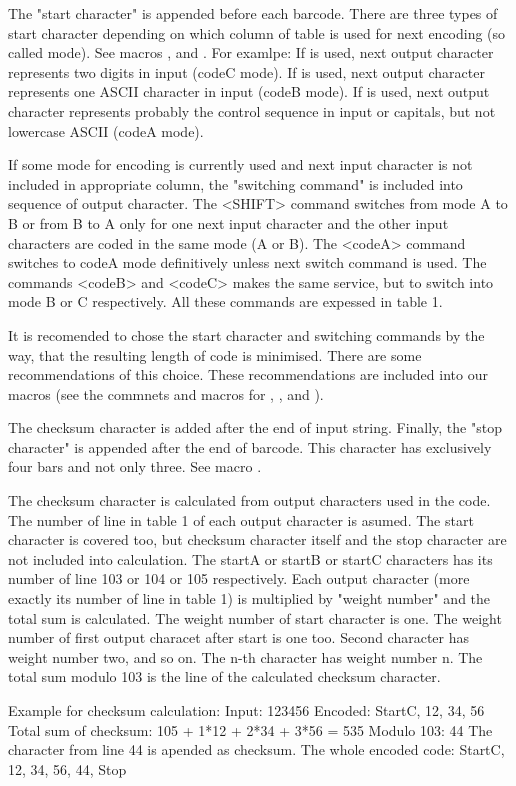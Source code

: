 The "start character" is appended before each barcode. There are three
types of start character depending on which column of table is used for
next encoding (so called mode). See macros \startA, \startB and \startC.
For examlpe: If \startC is used, next output character represents two
digits in input (codeC mode). If \startB is used, next output character
represents one ASCII character in input (codeB mode). If \startA is used,
next output character represents probably the control sequence in input or
capitals, but not lowercase ASCII (codeA mode).

If some mode for encoding is currently used and next input character is not
included in appropriate column, the "switching command" is included into
sequence of output character. The <SHIFT> command switches from mode A to
B or from B to A only for one next input character and the other input
characters are coded in the same mode (A or B). The <codeA> command
switches to codeA mode definitively unless next switch command is used.
The commands <codeB> and <codeC> makes the same service, but to switch into
mode B or C respectively. All these commands are expessed in table 1.

It is recomended to chose the start character and switching commands by the
way, that the resulting length of code is minimised. There are some
recommendations of this choice. These recommendations are included into our
macros (see the commnets and macros for \code, \codeA, \codeB and \codeC).

The checksum character is added after the end of input string. Finally,
the "stop character" is appended after the end of barcode. This character
has exclusively four bars and not only three. See macro \stop.

The checksum character is calculated from output characters used in the
code. The number of line in table 1 of each output character is asumed. The
start character is covered too, but checksum character itself and the
stop character are not included into calculation. The startA or startB or
startC characters has its number of line 103 or 104 or 105 respectively. Each
output character (more exactly its number of line in table 1) is multiplied
by "weight number" and the total sum is calculated. The weight number of
start character is one. The weight number of first output characet after
start is one too. Second character has weight number two, and so on. The
n-th character has weight number n. The total sum modulo 103 is the line of
the calculated checksum character.

Example for checksum calculation:
Input:    123456
Encoded:  StartC, 12, 34, 56
Total sum of checksum: 105 + 1*12 + 2*34 + 3*56 = 535
Modulo 103: 44
The character from line 44 is apended as checksum.
The whole encoded code: StartC, 12, 34, 56, 44, Stop





